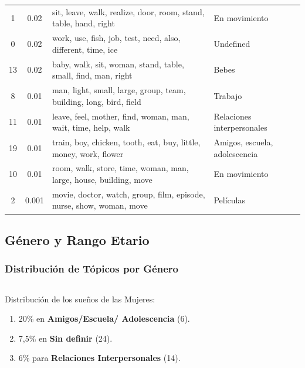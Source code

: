 \documentclass{beamer}
\begin{document}
\begin{frame}
\begin{table}[ht]
{{\begin{tabular}{|ccll|}
1 & 0.02 & sit, leave, walk, realize, door, room, stand, table, hand, right & En movimiento\\
0 & 0.02 & work, use, fish, job, test, need, also, different, time, ice & Undefined\\
13 & 0.02 & baby, walk, sit, woman, stand, table, small, find, man, right & Bebes\\
8 & 0.01 & man, light, small, large, group, team, building, long, bird, field & Trabajo\\
11 & 0.01 & leave, feel, mother, find, woman, man, wait, time, help, walk & Relaciones interpersonales\\
19 & 0.01 & train, boy, chicken, tooth, eat, buy, little, money, work, flower & Amigos, escuela, adolescencia\\
10 & 0.01 & room, walk, store, time, woman, man, large, house, building, move &  En movimiento\\
2 & 0.001 & movie, doctor, watch, group, film, episode, nurse, show, woman, move & Películas\\
   \hline
\end{tabular}}}
\end{table}
\end{frame}

\subsection{Género y Rango Etario}

\begin{frame}
\frametitle{Distribución de Tópicos por Género}
\begin{columns}
\begin{column}{0.6\textwidth}
Distribución de los sueños de las Mujeres:
\begin{enumerate}
    \item 20\% en \textbf{Amigos/Escuela/ Adolescencia} (6).
    \item 7,5\% en \textbf{Sin definir} (24).
    \item 6\% para \textbf{Relaciones Interpersonales} (14).
\end{enumerate}
\end{column}
\begin{column}{0.4\textwidth}
\end{column}
\end{columns}
\end{frame}
\end{document}
